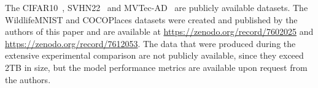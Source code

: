 The CIFAR10~\cite{krizhevsky2009learning}, SVHN22~\cite{netzer2011reading} and MVTec-AD~\cite{bergmann2019mvtec} are publicly available datasets. The WildlifeMNIST and COCOPlaces datasets were created and published by the authors of this paper and are available at \url{https://zenodo.org/record/7602025} and \url{https://zenodo.org/record/7612053}. The data that were produced during the extensive experimental comparison are not publicly available, since they exceed 2TB in size, but the model performance metrics are available upon request from the authors.
